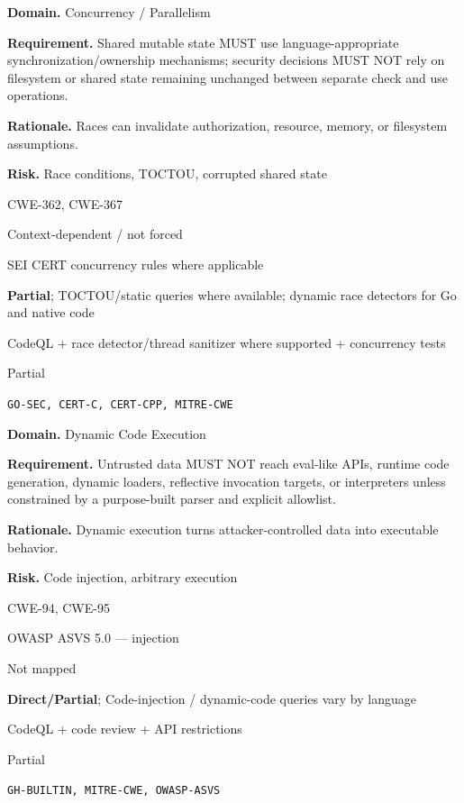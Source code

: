 \documentclass[10pt,letterpaper]{article}
\newcommand{\prioritybadge}[2]{\tcbox[on line,boxrule=0pt,arc=1.2mm,boxsep=0.7mm,left=1mm,right=1mm,top=0.4mm,bottom=0.4mm,colback=#2!12,coltext=#2]{\scriptsize\bfseries #1}}
\begin{document}
\begin{rulebox}[title={\texttt{SCS-ALL-CONC-001} \hfill \prioritybadge{High Priority}{High}}]
\textbf{Domain.} Concurrency / Parallelism

\textbf{Requirement.} Shared mutable state MUST use language-appropriate synchronization/ownership mechanisms; security decisions MUST NOT rely on filesystem or shared state remaining unchanged between separate check and use operations.

\textbf{Rationale.} Races can invalidate authorization, resource, memory, or filesystem assumptions.

\textbf{Risk.} Race conditions, TOCTOU, corrupted shared state

\begin{description}[leftmargin=2.65cm,labelwidth=2.3cm,style=nextline,itemsep=1pt,topsep=3pt]
  \item[CWE] CWE-362, CWE-367
  \item[OWASP] Context-dependent / not forced
  \item[CERT] SEI CERT concurrency rules where applicable
  \item[CodeQL] \textbf{Partial}; TOCTOU/static queries where available; dynamic race detectors for Go and native code
  \item[Enforcement] CodeQL + race detector/thread sanitizer where supported + concurrency tests
  \item[Automation] Partial
  \item[Sources] \texttt{GO-SEC, CERT-C, CERT-CPP, MITRE-CWE}
\end{description}
\end{rulebox}

\begin{rulebox}[title={\texttt{SCS-ALL-DYN-001} \hfill \prioritybadge{Critical Control}{Critical}}]
\textbf{Domain.} Dynamic Code Execution

\textbf{Requirement.} Untrusted data MUST NOT reach eval-like APIs, runtime code generation, dynamic loaders, reflective invocation targets, or interpreters unless constrained by a purpose-built parser and explicit allowlist.

\textbf{Rationale.} Dynamic execution turns attacker-controlled data into executable behavior.

\textbf{Risk.} Code injection, arbitrary execution

\begin{description}[leftmargin=2.65cm,labelwidth=2.3cm,style=nextline,itemsep=1pt,topsep=3pt]
  \item[CWE] CWE-94, CWE-95
  \item[OWASP] OWASP ASVS 5.0 --- injection
  \item[CERT] Not mapped
  \item[CodeQL] \textbf{Direct/Partial}; Code-injection / dynamic-code queries vary by language
  \item[Enforcement] CodeQL + code review + API restrictions
  \item[Automation] Partial
  \item[Sources] \texttt{GH-BUILTIN, MITRE-CWE, OWASP-ASVS}
\end{description}
\end{rulebox}
\end{document}
